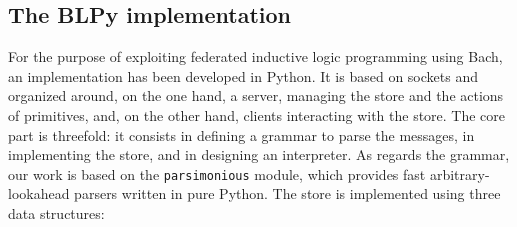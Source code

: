 \subsection{The BLPy implementation}



For the purpose of exploiting federated inductive logic programming using Bach, an implementation has been developed in Python. It is based on sockets and organized around, on the one hand, a server, managing the store and the actions of primitives, and, on the other hand, clients interacting with the store. The core part is threefold: it consists in defining a grammar to parse the messages, in implementing the store, and in designing an interpreter. As regards the grammar, our work is based on the \texttt{parsimonious} module, which provides fast arbitrary-lookahead parsers written in pure Python. The store is implemented using three data structures:

